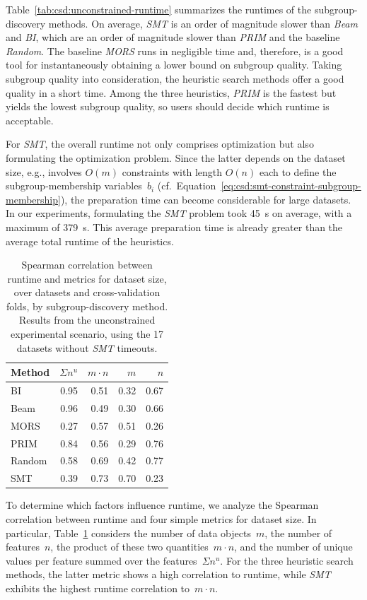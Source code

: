 \documentclass{article}
\theoremstyle{definition}
\begin{document}
Table~\ref{tab:csd:unconstrained-runtime} summarizes the runtimes of the subgroup-discovery methods.
On average, \emph{SMT} is an order of magnitude slower than \emph{Beam} and \emph{BI}, which are an order of magnitude slower than \emph{PRIM} and the baseline \emph{Random}.
The baseline \emph{MORS} runs in negligible time and, therefore, is a good tool for instantaneously obtaining a lower bound on subgroup quality.
Taking subgroup quality into consideration, the heuristic search methods offer a good quality in a short time.
Among the three heuristics, \emph{PRIM} is the fastest but yields the lowest subgroup quality, so users should decide which runtime is acceptable.

For \emph{SMT}, the overall runtime not only comprises optimization but also formulating the optimization problem.
Since the latter depends on the dataset size, e.g., involves $O(m)$ constraints with length $O(n)$ each to define the subgroup-membership variables~$b_i$ (cf.~Equation~\ref{eq:csd:smt-constraint-subgroup-membership}), the preparation time can become considerable for large datasets.
In our experiments, formulating the \emph{SMT} problem took 45~s on average, with a maximum of 379~s.
This average preparation time is already greater than the average total runtime of the heuristics.

\begin{table}[t]
	\centering
	\begin{tabular}{lrrrr}
		\toprule
		Method & $\Sigma n^u$ & $m \cdot n$ & $m$ & $n$ \\
		\midrule
		BI & 0.95 & 0.51 & 0.32 & 0.67 \\
		Beam & 0.96 & 0.49 & 0.30 & 0.66 \\
		MORS & 0.27 & 0.57 & 0.51 & 0.26 \\
		PRIM & 0.84 & 0.56 & 0.29 & 0.76 \\
		Random & 0.58 & 0.69 & 0.42 & 0.77 \\
		SMT & 0.39 & 0.73 & 0.70 & 0.23 \\
		\bottomrule
	\end{tabular}
	\caption{
		Spearman correlation between runtime and metrics for dataset size,
		over datasets and cross-validation folds, by subgroup-discovery method.
		Results from the unconstrained experimental scenario, using the 17 datasets without \emph{SMT} timeouts.
	}
	\label{tab:csd:unconstrained-runtime-correlation}
\end{table}

To determine which factors influence runtime, we analyze the Spearman correlation between runtime and four simple metrics for dataset size.
In particular, Table~\ref{tab:csd:unconstrained-runtime-correlation} considers the number of data objects~$m$, the number of features~$n$, the product of these two quantities~$m \cdot n$, and the number of unique values per feature summed over the features~$\Sigma n^u$.
For the three heuristic search methods, the latter metric shows a high correlation to runtime, while \emph{SMT} exhibits the highest runtime correlation to~$m \cdot n$.
\end{document}
